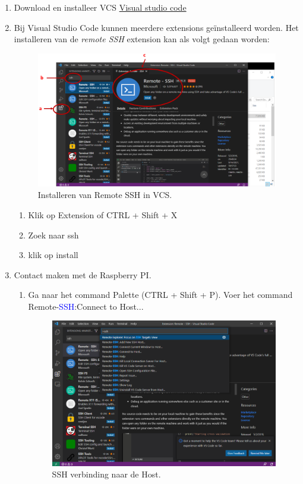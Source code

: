 \begin{enumerate}
	\item Download en installeer VCS \href{https://code.visualstudio.com/docs}{Visual studio code}
	\item Bij Visual Studio Code kunnen meerdere extensions geïnstalleerd worden. Het installeren van de \textit{remote SSH} extension kan als volgt gedaan worden:
	\begin{figure}[h!]
	\captionsetup{justification=centering}
	\includegraphics[width=0.6 \linewidth]{figuren/vcsExtSSH}
	\centering
	\caption{Installeren van Remote SSH in VCS.}
	\label{fig:vscEx}
\end{figure}


	\begin{enumerate}
		\item Klik op Extension  of CTRL + Shift + X
		\item Zoek naar ssh
		\item klik op install
	\end{enumerate}
    \item Contact maken met de Raspberry PI.
	\begin{enumerate}
	    \item Ga naar het command Palette (CTRL + Shift + P). Voer het command Remote-\textcolor{blue}{SSH}:Connect to Host...
	    \begin{figure}[h!]
		\captionsetup{justification=centering}
		\includegraphics[width=0.6 \linewidth]{figuren/VNCremoteSSH}
		\centering
		\caption{SSH verbinding naar de Host.}
		\label{fig:vscConnect}
	\end{figure}


\end{enumerate}
\end{enumerate}
